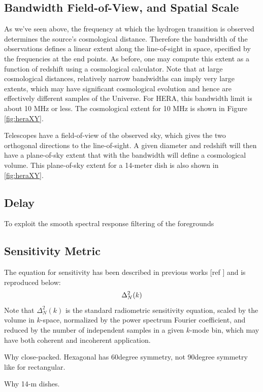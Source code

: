 \documentclass[ars]{/Users/daviddeboer1/Documents/Papers/Copernicus_LaTeX_Package_v_2_7/copernicus}
\begin{document}
\subsection{Bandwidth Field-of-View, and Spatial Scale}
As we've seen above, the frequency at which the hydrogen transition is observed
determines the source's cosmological distance. Therefore the bandwidth of the
observations defines a linear extent along the line-of-sight in space, specified by
the frequencies at the end points. As before, one may compute this extent as a
function of redshift using a cosmological calculator. Note that at large cosmological
distances, relatively narrow bandwidths can imply very large extents, which may have
significant cosmological evolution and hence are effectively different samples of the
Universe. For HERA, this bandwidth limit is about 10 MHz or less. The cosmological
extent for 10 MHz is shown in Figure \ref{fig:heraXY}.

Telescopes have a field-of-view of the observed sky, which gives the two orthogonal
directions to the line-of-sight. A given diameter and redshift will then have a
plane-of-sky extent that with the bandwidth will define a cosmological volume. This
plane-of-sky extent for a 14-meter dish is also shown in \ref{fig:heraXY}.

\subsection{Delay}
To exploit the smooth spectral response filtering of the foregrounds

\subsection{Sensitivity Metric}
The equation for sensitivity has been described in previous works [ref ] and is reproduced below:
\begin{equation}
\centering
\label{eq:sensitivity}
\Delta^2_N(k) 
\end{equation}
Note that $\Delta^2_N(k)$ is the standard radiometric sensitivity equation, scaled by
the volume in $k$-space, normalized by the power spectrum Fourier coefficient, and
reduced by the number of independent samples in a given $k$-mode bin, which may have
both coherent and incoherent application.



Why close-packed.  Hexagonal has 60degree symmetry, not 90degree symmetry like for rectangular.

Why 14-m dishes.
\end{document}
